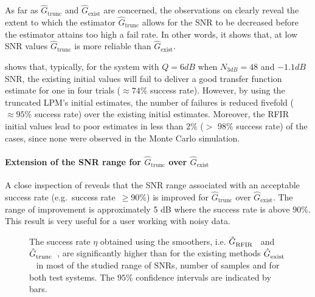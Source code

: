 As far as $\hat G_\mathrm{trunc}$ and $\hat G_\mathrm{exist}$ are concerned, the observations on  clearly reveal the extent to which the estimator $\hat G_\mathrm{trunc}$ allows for the SNR to be decreased before the estimator attains too high a fail rate. 
In other words, it shows that, at low SNR values $\hat G_\mathrm{trunc}$ is more reliable than $\hat G_\mathrm{exist}$. 

   shows that, typically, for the system with $Q=6\unit{dB}$ when $N_{3\unit{dB}}=48$ and $-1.1 \unit{dB}$ \gls{SNR}, the existing initial values will fail to deliver a good transfer function estimate for one in four trials ($\approx 74\%$ success rate).
However, by using the truncated \gls{LPM}'s initial estimates, the number of failures is reduced fivefold ($\approx 95\%$ success rate) over the existing initial estimates.
Moreover, the \gls{RFIR} initial values lead to poor estimates in less than $2\%$ ($>$ $98\%$ success rate) of the cases, since none were observed in the Monte Carlo simulation.

\paragraph*{Extension of the SNR range for $\hat G_\mathrm{trunc}$ over $\hat G_\mathrm{exist}$}
A close inspection of  reveals that the \gls{SNR} range associated with an acceptable success rate (e.g.\ success rate~$\geqslant 90\%$) is improved for $\hat G_\mathrm{trunc}$ over $\hat G_\mathrm{exist}$. The range of improvement is approximately 5 dB where the success rate is above $90\%$. This result is very useful for a user working with noisy data.

\begin{figure}
  \centering
  \setlength{\figurewidth}{0.85\columnwidth}
  \setlength{\figureheight}{0.68\figurewidth}
  
 \caption[Simulated success rate of the different initialization schemes for varying \gls{SNR}.]{The success rate $\eta$  obtained using the smoothers, i.e. $\hat{G}_{\mathrm{RFIR}}^{\mathrm{}}$~ and $\hat{G}_{\mathrm{trunc}}^{\mathrm{}}$~, are significantly higher than for the existing methods $\hat{G}_{\mathrm{exist}}^{\mathrm{}}$~ in most of the studied range of \glspl{SNR}, number of samples and for both test systems. The $95\%$ confidence intervals are indicated by bars.}
  \label{fig:successRateVS_SNR36N3dB}
\end{figure}

